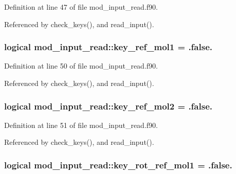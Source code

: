 Definition at line 47 of file mod\+\_\+input\+\_\+read.\+f90.



Referenced by check\+\_\+keys(), and read\+\_\+input().

\subsubsection[{\texorpdfstring{key\+\_\+ref\+\_\+mol1}{key_ref_mol1}}]{\setlength{\rightskip}{0pt plus 5cm}logical mod\+\_\+input\+\_\+read\+::key\+\_\+ref\+\_\+mol1 = .false.}\hypertarget{namespacemod__input__read_a58058a29fc5300521bfe3658ba0444e1}{}\label{namespacemod__input__read_a58058a29fc5300521bfe3658ba0444e1}


Definition at line 50 of file mod\+\_\+input\+\_\+read.\+f90.



Referenced by check\+\_\+keys(), and read\+\_\+input().

\subsubsection[{\texorpdfstring{key\+\_\+ref\+\_\+mol2}{key_ref_mol2}}]{\setlength{\rightskip}{0pt plus 5cm}logical mod\+\_\+input\+\_\+read\+::key\+\_\+ref\+\_\+mol2 = .false.}\hypertarget{namespacemod__input__read_a0e0f6bb92252196980696d427c1e70ed}{}\label{namespacemod__input__read_a0e0f6bb92252196980696d427c1e70ed}


Definition at line 51 of file mod\+\_\+input\+\_\+read.\+f90.



Referenced by check\+\_\+keys(), and read\+\_\+input().

\subsubsection[{\texorpdfstring{key\+\_\+rot\+\_\+ref\+\_\+mol1}{key_rot_ref_mol1}}]{\setlength{\rightskip}{0pt plus 5cm}logical mod\+\_\+input\+\_\+read\+::key\+\_\+rot\+\_\+ref\+\_\+mol1 = .false.}\hypertarget{namespacemod__input__read_aa5a0b3c68c22ac66d80805ec388ddc4a}{}\label{namespacemod__input__read_aa5a0b3c68c22ac66d80805ec388ddc4a}


